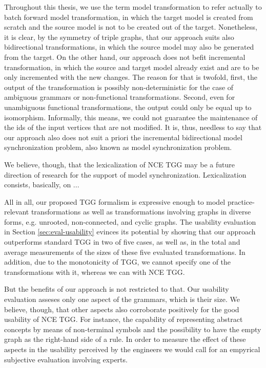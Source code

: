 Throughout this thesis, we use the term model transformation to refer actually to batch forward model transformation, in which the target model is created from scratch and the source model is not to be created out of the target. Nonetheless, it is clear, by the symmetry of triple graphs, that our approach suits also bidirectional transformations, in which the source model may also be generated from the target. On the other hand, our approach does not befit incremental transformation, in which the source and target model already exist and are to be only incremented with the new changes. The reason for that is twofold, first, the output of the transformation is possibly non-deterministic for the case of ambiguous grammars or non-functional transformations. Second, even for unambiguous functional transformations, the output could only be equal up to isomorphism. Informally, this means, we could not guarantee the maintenance of the ids of the input vertices that are not modified. It is, thus, needless to say that our approach also does not suit a priori the incremental bidirectional model synchronization problem, also known as model synchronization problem.

We believe, though, that the lexicalization of NCE TGG may be a future direction of research for the support of model synchronization. Lexicalization consists, basically, on ...

All in all, our proposed TGG formalism is expressive enough to model practice-relevant transformations as well as transformations involving graphs in diverse forms, e.g. unrooted, non-connected, and cyclic graphs. The usability evaluation in Section \ref{sec:eval-usability} evinces its potential by showing that our approach outperforms standard TGG in two of five cases, as well as, in the total and average measurements of the sizes of these five evaluated transformations. In addition, due to the monotonicity of TGG, we cannot specify one of the transformations with it, whereas we can with NCE TGG.

But the benefits of our approach is not restricted to that. Our usability evaluation asseses only one aspect of the grammars, which is their size. We believe, though, that other aspects also corroborate positively for the good usability of NCE TGG. For instance, the capability of representing abstract concepts by means of non-terminal symbols and the possibility to have the empty graph as the right-hand side of a rule. In order to measure the effect of these aspects in the usability perceived by the engineers we would call for an empyrical subjective evaluation involving experts.

